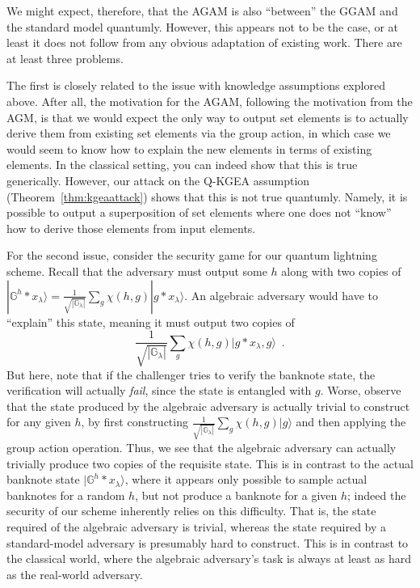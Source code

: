 \documentclass{article}\usepackage[a4paper,margin=20mm]{geometry}
\numberwithin{theorem}{section}
\numberwithin{equation}{section}
\newcommand{\G}{\mathbb{G}}
\begin{document}
We might expect, therefore, that the AGAM is also ``between'' the GGAM and the standard model quantumly. However, this appears not to be the case, or at least it does not follow from any obvious adaptation of existing work. There are at least three problems.

The first is closely related to the issue with knowledge assumptions explored above. After all, the motivation for the AGAM, following the motivation from the AGM, is that we would expect the only way to output set elements is to actually derive them from existing set elements via the group action, in which case we would seem to know how to explain the new elements in terms of existing elements. In the classical setting, you can indeed show that this is true generically. However, our attack on the Q-KGEA assumption (Theorem~\ref{thm:kgeaattack}) shows that this is not true quantumly. Namely, it is possible to output a superposition of set elements where one does not ``know'' how to derive those elements from input elements.

For the second issue, consider the security game for our quantum lightning scheme. Recall that the adversary must output some $h$ along with two copies of $|\G^h*x_\lambda\rangle=\frac{1}{\sqrt{|\G_\lambda|}}\sum_g \chi(h,g)|g*x_\lambda\rangle$. An algebraic adversary would have to ``explain'' this state, meaning it must output two copies of
\[\frac{1}{\sqrt{|\G_\lambda|}}\sum_{g}\chi(h,g)|g*x_\lambda,g\rangle\enspace .\]
But here, note that if the challenger tries to verify the banknote state, the verification will actually \emph{fail}, since the state is entangled with $g$. Worse, observe that the state produced by the algebraic adversary is actually trivial to construct for any given $h$, by first constructing $\frac{1}{\sqrt{|\G_\lambda|}}\sum_{g}\chi(h,g)|g\rangle$ and then applying the group action operation. Thus, we see that the algebraic adversary can actually trivially produce two copies of the requisite state. This is in contrast to the actual banknote state $|\G^h*x_\lambda\rangle$, where it appears only possible to sample actual banknotes for a random $h$, but not produce a banknote for a given $h$; indeed the security of our scheme inherently relies on this difficulty. That is, the state required of the algebraic adversary is trivial, whereas the state required by a standard-model adversary is presumably hard to construct. This is in contrast to the classical world, where the algebraic adversary's task is always at least as hard as the real-world adversary.
\end{document}
